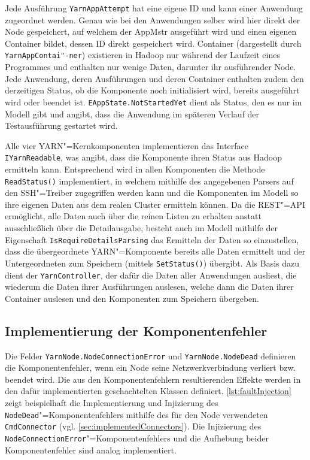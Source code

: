 Jede Ausführung \texttt{YarnAppAttempt} hat eine eigene ID und kann einer Anwendung zugeordnet werden.
Genau wie bei den Anwendungen selber wird hier direkt der Node gespeichert, auf welchem der \ac{AppMstr} ausgeführt wird und einen eigenen Container bildet, dessen ID direkt gespeichert wird.
Container (dargestellt durch \texttt{YarnAppContai"-ner}) existieren in Hadoop nur während der Laufzeit eines Programmes und enthalten nur wenige Daten, darunter ihr ausführender Node.
Jede Anwendung, deren Ausführungen und deren Container enthalten zudem den derzeitigen Status, ob die Komponente noch initialisiert wird, bereits ausgeführt wird oder beendet ist.
\texttt{EAppState.NotStartedYet} dient als Status, den es nur im Modell gibt und angibt, dass die Anwendung im späteren Verlauf der Testausführung gestartet wird.

Alle vier YARN"=Kernkomponenten implementieren das Interface \texttt{IYarnReadable}, was angibt, dass die Komponente ihren Status aus Hadoop ermitteln kann.
Entsprechend wird in allen Komponenten die Methode \texttt{ReadStatus()} implementiert, in welchem mithilfe des angegebenen Parsers auf den SSH"=Treiber zugegriffen werden kann und die Komponenten im Modell so ihre eigenen Daten aus dem realen Cluster ermitteln können.
Da die REST"=API ermöglicht, alle Daten auch über die reinen Listen zu erhalten anstatt ausschließlich über die Detailausgabe, besteht auch im Modell mithilfe der Eigenschaft \texttt{IsRequireDetailsParsing} das Ermitteln der Daten so einzustellen, dass die übergeordnete YARN"=Komponente bereits alle Daten ermittelt und der Untergeordneten zum Speichern (mittels \texttt{SetStatus()}) übergibt.
Als Basis dazu dient der \texttt{YarnController}, der dafür die Daten aller Anwendungen ausliest, die wiederum die Daten ihrer Ausführungen auslesen, welche dann die Daten ihrer Container auslesen und den Komponenten zum Speichern übergeben.

\subsection{Implementierung der Komponentenfehler}\label{sec:implementedFaults}

Die Felder \texttt{YarnNode.NodeConnectionError} und \texttt{YarnNode.NodeDead} definieren die Komponentenfehler, wenn ein Node seine Netzwerkverbindung verliert bzw. beendet wird.
Die aus den Komponentenfehlern resultierenden Effekte werden in den dafür implementierten geschachtelten Klassen definiert.
\autoref{lst:faultInjection} zeigt beispielhaft die Implementierung und Injizierung des \texttt{NodeDead}"=Komponentenfehlers mithilfe des für den Node verwendeten \texttt{CmdConnector} (vgl. \autoref{sec:implementedConnectors}).
Die Injizierung des \texttt{NodeConnectionError}"=Komponentenfehlers und die Aufhebung beider Komponentenfehler sind analog implementiert.

